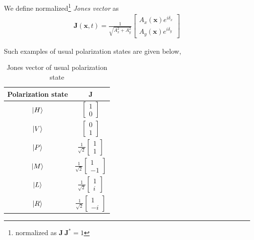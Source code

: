 \documentclass[11pt,a4paper]{article}
\numberwithin{equation}{section}
\begin{document}
We define normalized\footnote{normalized as $\textbf{J}\:\textbf{J}^\ast=1$} \textit{Jones vector} as
\begin{align}
	\textbf{J}(\textbf{x},t)=\frac{1}{\sqrt{A_x^2+A_y^2}}
	\begin{bmatrix}
		A_x(\textbf{x})e^{i\delta_x}\\
		A_y(\textbf{x})e^{i\delta_y}
	\end{bmatrix}
\end{align}

Such examples of usual polarization states are given below\cite{jones},
\begin{table}[H]
	\centering
	\begin{tabular}{ c c } 
		\hline
		\hline
		Polarization state & \textbf{J}\\
		\hline
		$\ket{H}$ & $\begin{bmatrix}1\\0\end{bmatrix}$ \\ \hline
		$\ket{V}$ & $\begin{bmatrix}0\\1\end{bmatrix}$ \\ \hline
		$\ket{P}$ & $\frac{1}{\sqrt{2}}\begin{bmatrix}1\\1\end{bmatrix}$ \\ \hline
		$\ket{M}$ & $\frac{1}{\sqrt{2}}\begin{bmatrix}1\\-1\end{bmatrix}$ \\ \hline
		$\ket{L}$ & $\frac{1}{\sqrt{2}}\begin{bmatrix}1\\i\end{bmatrix}$ \\ \hline
		$\ket{R}$ & $\frac{1}{\sqrt{2}}\begin{bmatrix}1\\-i\end{bmatrix}$ \\ 
		\hline
		\hline
	\end{tabular}
	\caption{Jones vector of usual polarization state}
	\label{table:1}
\end{table}
\end{document}
